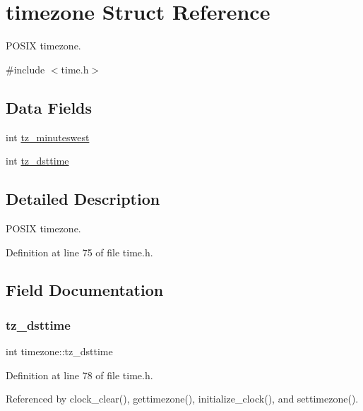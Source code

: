 \hypertarget{structtimezone}{}\section{timezone Struct Reference}
\label{structtimezone}


P\+O\+S\+IX timezone.  




{\ttfamily \#include $<$time.\+h$>$}

\subsection*{Data Fields}
\begin{DoxyCompactItemize}
\item 
int \hyperlink{structtimezone_a3042f7eff6e1b980728def76b1fa0eb7}{tz\+\_\+minuteswest}
\item 
int \hyperlink{structtimezone_a85259977aeb63b17e6ce94f19afdfd99}{tz\+\_\+dsttime}
\end{DoxyCompactItemize}


\subsection{Detailed Description}
P\+O\+S\+IX timezone. 

Definition at line 75 of file time.\+h.



\subsection{Field Documentation}
\mbox{\label{structtimezone_a85259977aeb63b17e6ce94f19afdfd99}} 
\subsubsection{\texorpdfstring{tz\+\_\+dsttime}{tz\_dsttime}}
{\footnotesize\ttfamily int timezone\+::tz\+\_\+dsttime}



Definition at line 78 of file time.\+h.



Referenced by clock\+\_\+clear(), gettimezone(), initialize\+\_\+clock(), and settimezone().

\mbox{\label{structtimezone_a3042f7eff6e1b980728def76b1fa0eb7}} 
